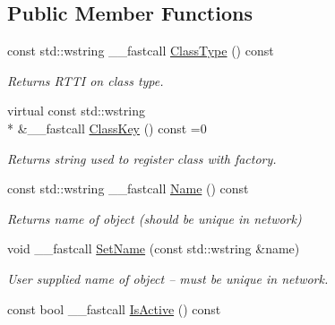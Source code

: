 \subsection*{Public Member Functions}
\begin{DoxyCompactItemize}
\item 
\hypertarget{class_t_r_t_base_a1c20ffac4117eccf2011d2a93147cef7}{const std\+::wstring \+\_\+\+\_\+fastcall \hyperlink{class_t_r_t_base_a1c20ffac4117eccf2011d2a93147cef7}{Class\+Type} () const }\label{class_t_r_t_base_a1c20ffac4117eccf2011d2a93147cef7}

\begin{DoxyCompactList}\small\item\em Returns R\+T\+T\+I on class type. \end{DoxyCompactList}\item 
virtual const std\+::wstring \\*
\&\+\_\+\+\_\+fastcall \hyperlink{class_t_r_t_base_a6083fd510cbcb00faa85e5934fc3c18e}{Class\+Key} () const =0
\begin{DoxyCompactList}\small\item\em Returns string used to register class with factory. \end{DoxyCompactList}\item 
\hypertarget{class_t_r_t_base_a2da78a149d3253738c69e2b180975819}{const std\+::wstring \+\_\+\+\_\+fastcall \hyperlink{class_t_r_t_base_a2da78a149d3253738c69e2b180975819}{Name} () const }\label{class_t_r_t_base_a2da78a149d3253738c69e2b180975819}

\begin{DoxyCompactList}\small\item\em Returns name of object (should be unique in network) \end{DoxyCompactList}\item 
\hypertarget{class_t_r_t_base_ac067ba851b9fe12a4a8d5f8305dd0333}{void \+\_\+\+\_\+fastcall \hyperlink{class_t_r_t_base_ac067ba851b9fe12a4a8d5f8305dd0333}{Set\+Name} (const std\+::wstring \&name)}\label{class_t_r_t_base_ac067ba851b9fe12a4a8d5f8305dd0333}

\begin{DoxyCompactList}\small\item\em User supplied name of object -- must be unique in network. \end{DoxyCompactList}\item 
\hypertarget{class_t_r_t_base_a6134ae5c10efab0cbdc42b20930495b1}{const bool \+\_\+\+\_\+fastcall \hyperlink{class_t_r_t_base_a6134ae5c10efab0cbdc42b20930495b1}{Is\+Active} () const }\label{class_t_r_t_base_a6134ae5c10efab0cbdc42b20930495b1}


\end{DoxyCompactItemize}
